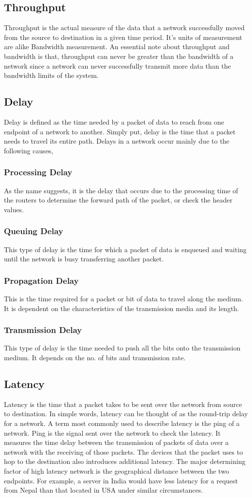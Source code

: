 \documentclass{home_assignment}
\begin{document}
\subsection{Throughput}
Throughput is the actual measure of the data that a network successfully moved from the source to destination in a given time period. It’s units of measurement are alike Bandwidth measurement. An essential note about throughput and bandwidth is that, throughput can never be greater than the bandwidth of a network since a network can never successfully transmit more data than the bandwidth limits of the system.
\subsection{Delay}
Delay is defined as the time needed by a packet of data to reach from one endpoint of a network to another. Simply put, delay is the time that a packet needs to travel its entire path. Delays in a network occur mainly due to the following causes,
\subsubsection*{Processing Delay}
As the name suggests, it is the delay that occurs due to the processing time of the routers to determine the forward path of the packet, or check the header values.
\subsubsection*{Queuing Delay}
This type of delay is the time for which a packet of data is enqueued and waiting until the network is busy transferring another packet.
\subsubsection*{Propagation Delay}
This is the time required for a packet or bit of data to travel along the medium. It is dependent on the characteristics of the transmission media and its length.
\subsubsection*{Transmission Delay}
This type of delay is the time needed to push all the bits onto the transmission medium. It depends on the no. of bits and transmission rate.
\subsection{Latency} Latency is the time that a packet takes to be sent over the network from source to destination. In simple words, latency can be thought of as the round-trip delay for a network. A term most commonly used to describe latency is the ping of a network.   Ping is the signal sent over the network to check the latency.   It measures the time delay between the transmission of packets of data over a network with the receiving of those packets. The devices that the packet uses to hop to the destination also introduces additional latency. The major determining factor of high latency network is the geographical distance between the two endpoints. For example, a server in India would have less latency for a request from Nepal than that located in USA under similar circumstances.
\end{document}
